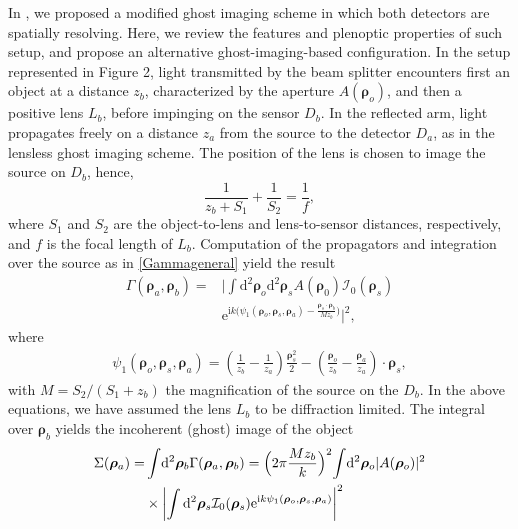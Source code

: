 \documentclass[aps,pra,amssymb,twocolumn,amsmath,superscriptaddress,showpacs,10pt]{revtex4-1}
\def\e{\mathrm{e}}
\def\d{\mathrm{d}}
\def\i{\mathrm{i}}
\begin{document}
In \cite{cpi_prl}, we proposed a modified ghost imaging scheme in which both detectors are spatially resolving. Here, we review the features and plenoptic properties of such setup, and propose an alternative ghost-imaging-based configuration. In the setup represented in Figure 2, light transmitted by the beam splitter encounters first an object at a distance $z_b$, characterized by the aperture $A(\bm{\rho}_o)$, and then a positive lens $L_b$, before impinging on the sensor $D_b$. In the reflected arm, light propagates freely on a distance $z_a$ from the source to the detector $D_a$, as in the lensless ghost imaging scheme. The position of the lens is chosen to image the source on $D_b$, hence,
\begin{equation}
\frac{1}{z_b+S_1}+\frac{1}{S_2} = \frac{1}{f},
\end{equation}
where $S_1$ and $S_2$ are the object-to-lens and lens-to-sensor distances, respectively, and $f$ is the focal length of $L_b$. Computation of the propagators and integration over the source as in \eqref{Gammageneral} yield the result \cite{cpi_prl,cpi_qmqm}
\begin{align}\label{Gammasecond}
\Gamma(\bm{\rho}_a,\bm{\rho}_b) = & \Biggl| \int\!\d^2\bm{\rho}_o \d^2\bm{\rho}_s  A(\bm{\rho}_0) \mathcal{I}_0 (\bm{\rho}_s) \nonumber \\
& \e^{\i k \bigl( \psi_1(\bm{\rho}_o,\bm{\rho}_s,\bm{\rho}_a) - \frac{\bm{\rho}_s\cdot\bm{\rho}_b}{M z_b} \bigr)} \Biggr|^2,
\end{align}
where
\begin{align}\label{psisecond}
\psi_1(\bm{\rho}_o,\bm{\rho}_s,\bm{\rho}_a) = \left( \frac{1}{z_b} - \frac{1}{z_a} \right) \frac{\bm{\rho}_s^2}{2} - \left( \frac{\bm{\rho}_o}{z_b}  - \frac{\bm{\rho}_a}{z_a} \right) \cdot \bm{\rho}_s  ,
\end{align}
with $M=S_2/(S_1+z_b)$ the magnification of the source on the $D_b$. In the above equations, we have assumed the lens $L_b$ to be diffraction limited. The integral over $\bm{\rho}_b$ yields the incoherent (ghost) image of the object 
\begin{align}
\Sigma(\bm{\rho}_a) = & \int\!\d^2\bm{\rho}_b \Gamma(\bm{\rho}_a,\bm{\rho}_b) = \Bigl(2\pi \frac{M z_b}{k}\Bigr)^2 \!\int\!\d^2\bm{\rho}_o |A(\bm{\rho}_o)|^2 \nonumber \\
& \times \left| \int\d^2\bm{\rho}_s \mathcal{I}_0(\bm{\rho}_s) \e^{\i k \psi_1(\bm{\rho}_o,\bm{\rho}_s,\bm{\rho}_a)} \right|^2
\end{align}
\end{document}
